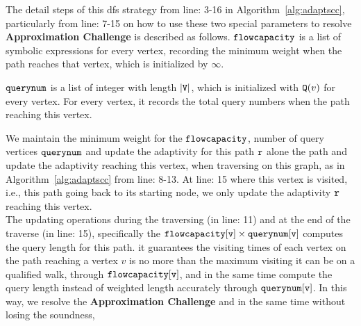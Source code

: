 The detail steps of this dfs strategy
from line: 3-16 in Algorithm~\ref{alg:adaptscc},
particularly from line: 7-15 on how to 
use these two special parameters to resolve \textbf{Approximation Challenge}
 is described as follows.
 $\mathtt{flowcapacity}$ is a list of symbolic expressions for every vertex, recording the minimum weight when the path reaches that vertex, which is initialized by $\infty$.

$\mathtt{querynum}$ is a list of integer with length $|\mathtt{V}|$, which is initialized with $\mathtt{Q}(v)$ for every vertex. 
For every vertex, 
it records the total query numbers when the path reaching this vertex.

We maintain the minimum weight for the 
$\mathtt{flowcapacity}$, 
number of query vertices 
$\mathtt{querynum}$ 
and update the adaptivity for this path $\mathtt{r}$
alone the path and update the adaptivity reaching 
this vertex, 
when traversing on this graph, as in Algorithm~\ref{alg:adaptscc} from line: 8-13.
At line: 15 where this vertex is visited, i.e., this path 
going back to its starting node,
we only update the adaptivity $\mathtt{r}$ reaching this vertex.
\\
The updating operations
during the traversing 
(in line: 11) and 
at the end of the traverse (in line: 15),
specifically the $\mathtt{flowcapacity[v] \times querynum[v]}$ 
computes the query length for this path. 
it guarantees 
the visiting times of each vertex on the path reaching a vertex $v$ is no more than 
the maximum visiting it can be on a qualified walk, through $\mathtt{flowcapacity[v]}$,
and in the same time  compute the query length instead of weighted length accurately through 
$\mathtt{ querynum[v]}$.
In this way, we resolve the \textbf{Approximation Challenge} and in the same time without losing the soundness,
